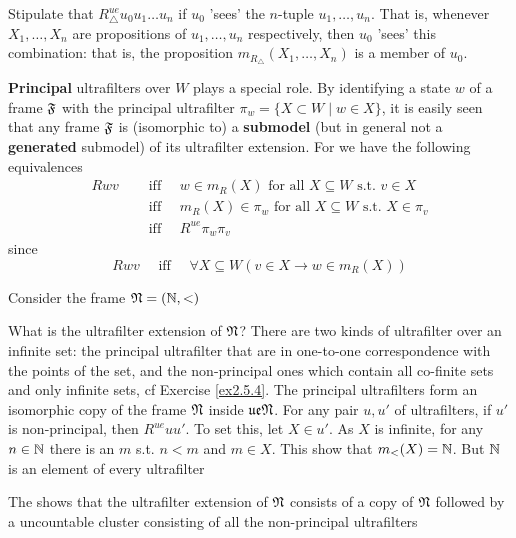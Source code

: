 \documentclass[11pt]{article}
\newcommand{\ue}{\fu\fe}
\begin{document}
Stipulate that \(R^{ue}_{\triangle}u_0u_1\dots u_n\) if \(u_0\) 'sees' the
\(n\)-tuple \(u_1,\dots,u_n\). That is, whenever \(X_1,\dots,X_n\) are
propositions of \(u_1,\dots, u_n\) respectively, then \(u_0\) 'sees' this
combination: that is, the proposition \(m_{R_{\triangle}}(X_1,\dots,X_n)\)
is a member of \(u_0\).

\textbf{Principal} ultrafilters over \(W\) plays a special role. By identifying a
state \(w\) of a frame \(\mathfrak{F}\) with the principal ultrafilter
\(\pi_w=\{X\subset W\mid w\in X\}\), it
is easily seen that any frame \(\mathfrak{F}\) is (isomorphic to) a \textbf{submodel} (but in
general not a \textbf{generated} submodel) of its ultrafilter extension. For we have
the following equivalences
\begin{align*}
Rwv &\quad\text{ iff }\quad
w\in m_R(X)\text{ for all }X\subseteq W\text{ s.t. }v\in X\\
&\quad\text{ iff }\quad
m_R(X)\in\pi_w\text{ for all }X\subseteq W\text{ s.t. }X\in\pi_v\\
&\quad\text{ iff }\quad R^{ue}\pi_w\pi_v
\end{align*}
since
\begin{equation*}
Rwv \quad\text{ iff }\quad
\forall X\subseteq W(v\in X\to w\in m_R(X))
\end{equation*}

\begin{examplle}[]
\label{example2.58}
Consider the frame \(\mathfrak{N}=(\mathbb{N},<)\)
\begin{center}
\end{center}
What is the ultrafilter extension of \(\mathfrak{N}\)? There are two kinds of
ultrafilter over an infinite set: the principal ultrafilter that are in
one-to-one correspondence with the points of the set, and the non-principal
ones which contain all co-finite sets and only infinite sets, cf Exercise
\ref{ex2.5.4}. The principal ultrafilters form an isomorphic copy of the frame
\(\mathfrak{N}\) inside \(\ue\fN\). For any pair \(u,u'\) of ultrafilters, if \(u'\)
is non-principal, then \(R^{ue}uu'\). To set this, let \(X\in u'\). As
\(X\) is infinite, for any \(n\in\mathbb{N}\) there is an \(m\) s.t. \(n<m\) and
\(m\in X\). This show that \(m_<(X)=\mathbb{N}\). But \(\mathbb{N}\) is an element of every
ultrafilter

The shows that the ultrafilter extension of \(\mathfrak{N}\) consists of a copy of
\(\mathfrak{N}\) followed by a uncountable cluster consisting of all the
non-principal ultrafilters
\end{examplle}
\end{document}
